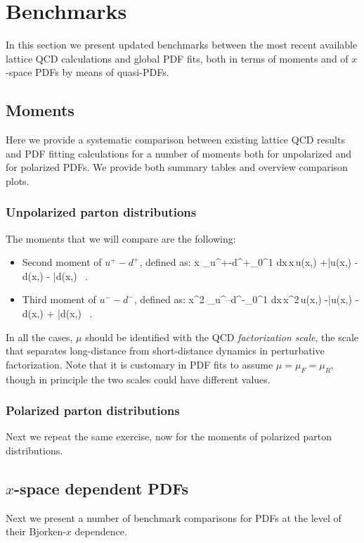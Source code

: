 \section{Benchmarks}
\label{sec:benchmarking}

In this section we present updated benchmarks between the most
recent available lattice QCD calculations and global PDF fits,
both in terms of moments and of $x$-space PDFs by means of
quasi-PDFs.

\subsection{Moments}

Here we provide a systematic comparison between existing
lattice QCD results and PDF fitting calculations
for a number of moments both for unpolarized
and for polarized PDFs.
%
We provide both summary tables and overview comparison plots.

\subsubsection{Unpolarized parton distributions}

The moments that we will compare are the following:

\begin{itemize}

\item Second moment of $u^+-d^+$, defined as:
  \be
  \la x \ra_{u^+-d^+}\equiv \int_0^1 dx\,x\,\lc u(x,\mu)
  +\bar{u}(x,\mu)
-d(x,\mu) - \bar{d}(x,\mu) \, .
  \rc
  \ee

\item Third moment of $u^--d^-$, defined as:
  \be
  \la x^2 \ra_{u^--d^-}\equiv \int_0^1 dx\,x^2\,\lc u(x,\mu)
  -\bar{u}(x,\mu)
-d(x,\mu) + \bar{d}(x,\mu) \, .
  \rc
  \ee

  \end{itemize}

In all the cases, $\mu$ should be identified with the QCD
{\it factorization scale}, the scale that separates
long-distance from short-distance dynamics in perturbative
factorization.
%
Note that it is customary in PDF fits to assume
$\mu=\mu_F=\mu_R$, though in principle the two scales
could have different values.

\subsubsection{Polarized parton distributions}

Next we repeat the same exercise, now for the moments
of polarized parton distributions.


\subsection{$x$-space dependent PDFs}

Next we present a number of benchmark comparisons for
PDFs at the level of their Bjorken-$x$
dependence.
